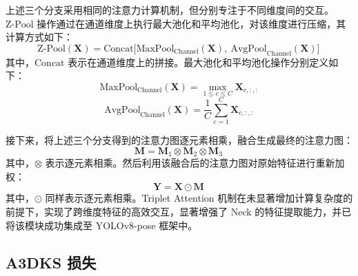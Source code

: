 上述三个分支采用相同的注意力计算机制，但分别专注于不同维度间的交互。$\text{Z-Pool}$ 操作通过在通道维度上执行最大池化和平均池化，对该维度进行压缩，其计算方式如下：
\begin{equation} 
	\text{Z-Pool}(\mathbf{X}) = \text{Concat}\Big[\text{MaxPool}_{\text{Channel}}(\mathbf{X}),\ \text{AvgPool}_{\text{Channel}}(\mathbf{X})\Big]\,
\end{equation}
其中，$\text{Concat}$ 表示在通道维度上的拼接。最大池化和平均池化操作分别定义如下：
\begin{equation} 
	\text{MaxPool}_{\text{Channel}}(\mathbf{X}) = \max_{1 \le c \le C} \mathbf{X}_{c,:,:}
\end{equation}
\begin{equation} 
	\text{AvgPool}_{\text{Channel}}(\mathbf{X}) = \frac{1}{C} \sum_{c=1}^{C} \mathbf{X}_{c,:,:}
\end{equation}

接下来，将上述三个分支得到的注意力图逐元素相乘，融合生成最终的注意力图：
\begin{equation} 
	\mathbf{M} = \mathbf{M}_{1} \otimes \mathbf{M}_{2} \otimes \mathbf{M}_{3}\,
\end{equation}
其中，$\otimes$ 表示逐元素相乘。然后利用该融合后的注意力图对原始特征进行重新加权：
\begin{equation} 
	\mathbf{Y} = \mathbf{X} \odot \mathbf{M}\,
\end{equation}
其中，$\odot$ 同样表示逐元素相乘。Triplet Attention 机制在未显著增加计算复杂度的前提下，实现了跨维度特征的高效交互，显著增强了 Neck 的特征提取能力，并已将该模块成功集成至 YOLOv8-pose 框架中。



\subsection{A3DKS 损失}


